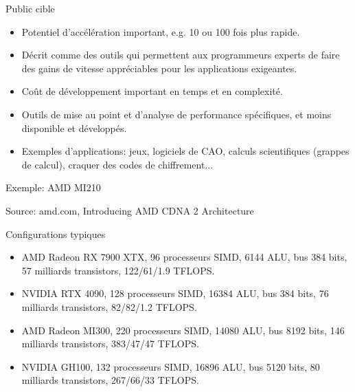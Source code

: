 \documentclass[10pt]{beamer}
\begin{document}
\begin{frame}{Public cible}

  \begin{itemize}
    \item Potentiel d'accélération important, e.g. 10 ou 100 fois plus rapide.

    \item Décrit comme des outils qui permettent aux programmeurs experts de faire des gains de vitesse appréciables pour les applications exigeantes.

    \item Coût de développement important en temps et en complexité.

    \item Outils de mise au point et d'analyse de performance spécifiques, et moins disponible et développés.

    \item Exemples d'applications: jeux, logiciels de CAO, calculs scientifiques (grappes de calcul), craquer des codes de chiffrement...
  \end{itemize}
\end{frame}

\begin{frame}[fragile]{Exemple: AMD MI210}

  \begin{center}
  \end{center}
Source: amd.com, Introducing AMD CDNA 2 Architecture
\end{frame}

\begin{frame}{Configurations typiques}

  \begin{itemize}
    \item AMD Radeon RX 7900 XTX, 96 processeurs SIMD, 6144 ALU, bus 384 bits, 57 milliards transistors, 122/61/1.9 TFLOPS.

    \item NVIDIA RTX 4090, 128 processeurs SIMD, 16384 ALU, bus 384 bits, 76 milliards transistors, 82/82/1.2 TFLOPS.

    \item AMD Radeon MI300, 220 processeurs SIMD, 14080 ALU, bus 8192 bits, 146 milliards transistors, 383/47/47 TFLOPS.

    \item NVIDIA GH100, 132 processeurs SIMD, 16896 ALU, bus 5120 bits, 80 milliards transistors, 267/66/33 TFLOPS.    
  \end{itemize}
\end{frame}
\end{document}
